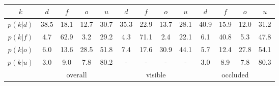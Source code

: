 \begin{center}
	\footnotesize
	\begin{tabular}{c|cccc|cccc|cccc}
		$k$ & $d$ & $f$ & $o$ & $u$ & $d$ & $f$ & $o$ & $u$ & $d$ & $f$ & $o$ & $u$\\
		\hline
		$p(k|d)$ & \textcolor{mygreen}{38.5} & 18.1 & 12.7 & 30.7 & \textcolor{mygreen}{35.3} & 22.9 & 13.7 & 28.1 & \textcolor{mygreen}{40.9} & 15.9 & 12.0 & 31.2\\
		$p(k|f)$ & 4.7 & \textcolor{mygreen}{62.9} & 3.2 & 29.2 & 4.3 & \textcolor{mygreen}{71.1} & 2.4 & 22.1 & 6.1 & \textcolor{mygreen}{40.8} & 5.3 & 47.8\\
		$p(k|o)$ & 6.0 & 13.6 & \textcolor{mygreen}{28.5} & 51.8 & 7.4 & 17.6 & \textcolor{mygreen}{30.9} & 44.1 & 5.7 & 12.4 & \textcolor{mygreen}{27.8} & 54.1\\
		$p(k|u)$ & 3.0 & 9.0 & 7.8 & \textcolor{mygreen}{80.2} & - & - & - & - & 3.0 & 8.9 & 7.8 & \textcolor{mygreen}{80.3} \\
		\hline
		& \multicolumn{4}{c|}{overall} & \multicolumn{4}{c|}{visible} & \multicolumn{4}{c}{occluded}
	\end{tabular}
\end{center}



